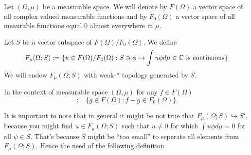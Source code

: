 \documentclass[main.tex]{subfiles}
\begin{document}
%

\begin{definition}
\label{dirac-notation-space}
Let $(\Omega, \mu)$ be a measurable space. We will denote by $F(\Omega)$ a vector space of all complex valued measurable functions and by $F_0(\Omega)$ a vector space of all meaurable functions equal 0 almost everywhere in $\mu$. 

Let $S$ be a vector subspace of $F(\Omega)/F_0(\Omega)$.
We define 
\begin{equation}
F_\mu(\Omega; S) := \{u\in F(\Omega)/F_0(\Omega): S\ni\phi\mapsto \int u\phi d\mu\in \mathbb{C} \text{ is continuous}\}
\end{equation}
We will endow $F_\mu(\Omega; S)$ with weak-* topology generated by $S$.
\end{definition}

In the context of measurable space $(\Omega, \mu)$ for any $f\in F(\Omega)$
\begin{equation}
[f] := \{g\in F(\Omega): f - g\in F_0(\Omega)\}.
\end{equation}

It is important to note that in general it might be not true that $F_\mu(\Omega; S)\hookrightarrow S'$, because you might find $u\in F_\mu(\Omega; S)$ such that $u\not=0$ for which $\int u\phi d\mu = 0$ for all $\psi\in S$. That's because $S$ might be ``too small'' to seperate all elements from $F_\mu(\Omega; S)$. Hence the need of the following definition.
\end{document}
